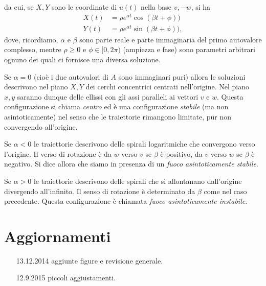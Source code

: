 \documentclass[italian,a4paper]{scrartcl}
\begin{document}
da cui, se $X,Y$ sono le coordinate di $u(t)$ nella base $v,-w$, si ha
\begin{align*}
X(t) &= \rho e^{\alpha t} \cos(\beta t+\phi))\\
Y(t) &= \rho e^{\alpha t} \sin(\beta t+\phi)),
\end{align*}
dove, ricordiamo, $\alpha$ e $\beta$ sono parte reale e parte
immaginaria del primo autovalore complesso, mentre $\rho\ge 0$ e $\phi\in[0,2\pi)$
(ampiezza e fase) sono parametri arbitrari ognuno dei quali ci
fornisce una diversa soluzione.

Se $\alpha=0$
(cioè i due autovalori di $A$ sono immaginari puri)
allora le soluzioni descrivono nel piano $X,Y$ dei cerchi concentrici
centrati nell'origine. Nel piano $x,y$ saranno dunque delle ellissi
con gli assi paralleli ai vettori $v$ e $w$. Questa configurazione si
chiama \emph{centro} ed è una configurazione \emph{stabile} (ma non
asintoticamente)
nel senso che le traiettorie rimangono limitate, pur non convergendo
all'origine.

Se $\alpha<0$
le traiettorie descrivono delle spirali logaritmiche che convergono
verso l'origine. Il verso di rotazione è da $w$ verso $v$ se $\beta$ è
positivo, da $v$ verso $w$ se $\beta$ è negativo.
Si dice allora che siamo in presenza di un
\emph{fuoco asintoticamente stabile}.

Se $\alpha>0$
le traiettorie descrivono delle spirali che si allontanano
dall'origine divergendo all'infinito. Il senso di rotazione è
determinato da $\beta$ come nel caso precedente.
Questa configurazione è chiamata \emph{fuoco asintoticamente instabile}.

\section*{Aggiornamenti}
\begin{itemize}
\item[13.12.2014] aggiunte figure e revisione generale.
\item[12.9.2015] piccoli aggiustamenti.
\end{itemize}
\end{document}
